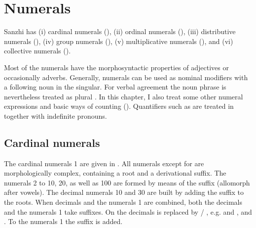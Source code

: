 \chapter{Numerals}
\label{cpt:numerals}

Sanzhi has (i) cardinal numerals (), (ii) ordinal numerals (), (iii) distributive numerals (), (iv) group numerals (), (v) multiplicative numerals (), and (vi) collective numerals ().

Most of the numerals have the morphosyntactic properties of adjectives or occasionally adverbs. Generally, numerals can be used as nominal modifiers with a following noun in the singular. For verbal agreement the noun phrase is nevertheless treated as plural . In this chapter, I also treat some other numeral expressions and basic ways of counting (). Quantifiers such as  are treated in  together with indefinite pronouns.




\section{Cardinal numerals}
\label{sec:cardinalnumerals}

The cardinal numerals 1 are given in . All numerals except for   are morphologically complex, containing a root and a derivational suffix. The numerals 2 to 10, 20, as well as 100 are formed by means of the suffix  (allomorph  after vowels). The decimal numerals 10 and 30 are built by adding the suffix  to the roots. When decimals and the numerals 1 are combined, both the decimals and the numerals 1 take suffixes. On the decimals  is replaced by  / , e.g.   and ,   and . To the numerals 1 the suffix  is added.

